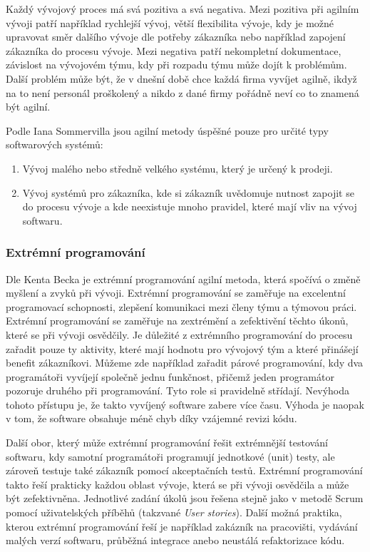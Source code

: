 \documentclass[czech,master,public,dept460,male,cpdeclaration,oneside]{diploma}
\begin{document}
Každý vývojový proces má svá pozitiva a svá negativa. Mezi pozitiva při agilním vývoji patří například rychlejší vývoj, větší flexibilita vývoje, kdy je možné upravovat směr dalšího vývoje dle potřeby zákazníka nebo například zapojení zákazníka do procesu vývoje. Mezi negativa patří nekompletní dokumentace, závislost na vývojovém týmu, kdy při rozpadu týmu může dojít k problémům. Další problém může být, že v dnešní době chce každá firma vyvíjet agilně, ikdyž na to není personál proškolený a nikdo z dané firmy pořádně neví co to znamená být agilní.

Podle Iana Sommervilla \cite{ref:sommerrville_agile_products} jsou agilní metody úspěšné pouze pro určité typy softwarových systémů:

\begin{enumerate}
\item Vývoj malého nebo středně velkého systému, který je určený k prodeji.
\item Vývoj systémů pro zákazníka, kde si zákazník uvědomuje nutnost zapojit se do procesu vývoje a kde neexistuje mnoho pravidel, které mají vliv na vývoj softwaru.
\end{enumerate}


\subsubsection{Extrémní programování}
Dle Kenta Becka \cite{ref:what_is_xp} je extrémní programování agilní metoda, která spočívá o změně myšlení a zvyků při vývoji. Extrémní programování se zaměřuje na excelentní programovací schopnosti, zlepšení komunikaci mezi členy týmu a týmovou práci. Extrémní programování se zaměřuje na zextrémění a zefektivění těchto úkonů, které se při vývoji osvědčily. Je důležité z extrémního programování do procesu zařadit pouze ty aktivity, které mají hodnotu pro vývojový tým a které přinášejí benefit zákazníkovi. Můžeme zde například zařadit párové programování, kdy dva programátoři vyvíjejí společně jednu funkčnost, přičemž jeden programátor pozoruje druhého při programování. Tyto role si pravidelně střídají. Nevýhoda tohoto přístupu je, že takto vyvíjený software zabere více času. Výhoda je naopak v tom, že software obsahuje méně chyb díky vzájemné revizi kódu.

Další obor, který může extrémní programování řešit extrémnější testování softwaru, kdy samotní programátoři programují jednotkové (unit) testy, ale zároveň testuje také zákazník pomocí akceptačních testů. Extrémní programování takto řeší prakticky každou oblast vývoje, která se při vývoji osvědčila a může být zefektivněna. Jednotlivé zadání úkolů jsou řešena stejně jako v metodě Scrum pomocí uživatelských příběhů (takzvané \textit{User stories}). Další možná praktika, kterou extrémní programování řeší je například zakázník na pracovišti, vydávání malých verzí softwaru, průběžná integrace anebo neustálá refaktorizace kódu.
\end{document}
